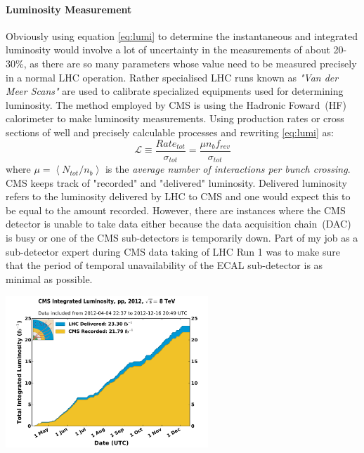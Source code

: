 \paragraph*{Luminosity Measurement}
\par
Obviously using equation \ref{eq:lumi} to determine the instantaneous and integrated luminosity would involve a lot of uncertainty in the measurements of about 20-30\%, as there are so many parameters whose value need to be measured precisely in a normal LHC operation. Rather specialised LHC runs known as \textit{"Van der Meer Scans"}\cite{lhclumi} are used to calibrate specialized equipments used for determining luminosity.
The method employed by CMS is using the Hadronic Foward~(HF) calorimeter to make luminosity measurements.
Using production rates or cross sections of well and precisely calculable processes and rewriting \ref{eq:lumi} as:
\begin{equation}\label{eq:LInt}
 \mathscr{L} \equiv \frac{Rate_{tot}}{\sigma_{tot}}    = \frac{\mu \mathit{n}_{b} f_{rev}}{\sigma_{tot}} 
\end{equation}
where $\mu = \left\langle \mathit{N}_{tot}/ \mathit{n}_{b} \right\rangle $ is the \textit{average number of interactions per bunch crossing}.
CMS keeps track of "recorded" and "delivered" luminosity. Delivered luminosity refers to the luminosity delivered by LHC to CMS and one would expect this to be equal to  the amount recorded. However, there are instances where the CMS detector is unable to take data either because the data acquisition chain~(DAC) is busy or one of the CMS sub-detectors is temporarily down. Part of my job as a sub-detector expert during CMS data taking of LHC Run 1 was to make sure that the period of temporal unavailability of the ECAL sub-detector is as minimal as possible.
\begin{center}
\centering
\mbox{\includegraphics[width=3in]{THESISPLOTS/int_lumi_per_day_cumulative_pp_2012.pdf}
}
\label{fig:cmslumi}
\end{center}

